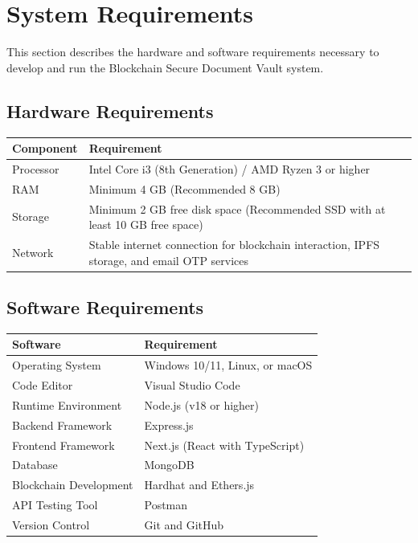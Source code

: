 \documentclass[12pt]{article}
\begin{document}
\section{System Requirements}

This section describes the hardware and software requirements necessary to develop and run the Blockchain Secure Document Vault system.

\subsection{Hardware Requirements}

\begin{center}
\begin{tabular}{|l|p{10cm}|}
\hline
\textbf{Component} & \textbf{Requirement} \\
\hline
Processor & Intel Core i3 (8th Generation) / AMD Ryzen 3 or higher \\
\hline
RAM & Minimum 4 GB (Recommended 8 GB) \\
\hline
Storage & Minimum 2 GB free disk space (Recommended SSD with at least 10 GB free space) \\
\hline
Network & Stable internet connection for blockchain interaction, IPFS storage, and email OTP services \\
\hline
\end{tabular}
\end{center}

\subsection{Software Requirements}

\begin{center}
\begin{tabular}{|l|p{10cm}|}
\hline
\textbf{Software} & \textbf{Requirement} \\
\hline
Operating System & Windows 10/11, Linux, or macOS \\
\hline
Code Editor & Visual Studio Code \\
\hline
Runtime Environment & Node.js (v18 or higher) \\
\hline
Backend Framework & Express.js \\
\hline
Frontend Framework & Next.js (React with TypeScript) \\
\hline
Database & MongoDB \\
\hline
Blockchain Development & Hardhat and Ethers.js \\
\hline
API Testing Tool & Postman \\
\hline
Version Control & Git and GitHub \\
\hline
\end{tabular}
\end{center}
\end{document}

